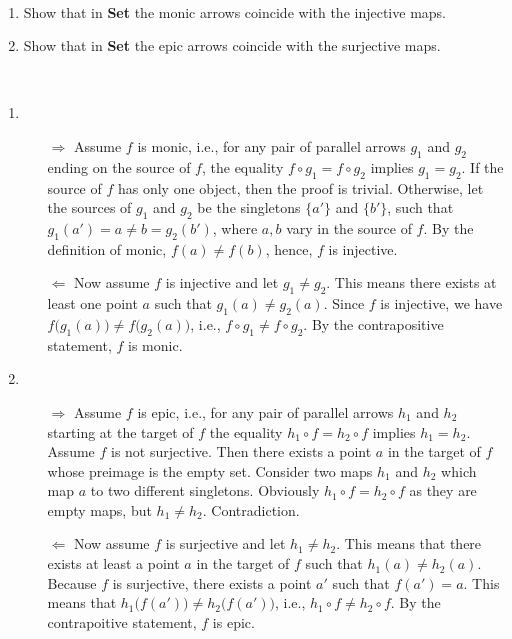 \documentclass[11pt,a4paper]{article}
\begin{document}
\begin{exercise}~
    \begin{enumerate}[label=(\alph*)]
        \item Show that in \textbf{Set} the monic arrows coincide with the injective maps.
        \item Show that in \textbf{Set} the epic arrows coincide with the surjective maps.
    \end{enumerate}
\end{exercise}
\begin{solution}~
    \begin{enumerate}[label=(\alph*)]
        \item \begin{enumerate}[label=(\alph*)]
            \item[$\Rightarrow$] Assume $f$ is monic, i.e., for any pair of parallel arrows $g_1$ and $g_2$ ending on the source of $f$, the equality $f\circ g_1=f\circ g_2$ implies $g_1=g_2$. If the source of $f$ has only one object, then the proof is trivial. Otherwise, let the sources of $g_1$ and $g_2$ be the singletons $\{a'\}$ and $\{b'\}$, such that $g_1(a')=a\neq b= g_2(b')$, where $a, b$ vary in the source of $f$. By the definition of monic, $f(a)\neq f(b)$, hence, $f$ is injective.
            \item[$\Leftarrow$] Now assume $f$ is injective and let $g_1\neq g_2$. This means there exists at least one point $a$ such that $g_1(a)\neq g_2(a)$. Since $f$ is injective, we have $f\big(g_1(a)\big)\neq f\big(g_2(a)\big)$, i.e., $f\circ g_1\neq f\circ g_2$. By the contrapositive statement, $f$ is monic.
        \end{enumerate}
        \item \begin{enumerate}[label=(\alph*)]
            \item[$\Rightarrow$] Assume $f$ is epic, i.e., for any pair of parallel arrows $h_1$ and $h_2$ starting at the target of $f$ the equality $h_1\circ f=h_2\circ f$ implies $h_1=h_2$. Assume $f$ is not surjective. Then there exists a point $a$ in the target of $f$ whose preimage is the empty set. Consider two maps $h_1$ and $h_2$ which map $a$ to two different singletons. Obviously $h_1\circ f=h_2\circ f$ as they are empty maps, but $h_1\neq h_2$. Contradiction.
            \item[$\Leftarrow$] Now assume $f$ is surjective and let $h_1\neq h_2$. This means that there exists at least a point $a$ in the target of $f$ such that $h_1(a)\neq h_2(a)$. Because $f$ is surjective, there exists a point $a'$ such that $f(a')=a$. This means that $h_1\big(f(a')\big) \neq  h_2\big(f(a')\big)$, i.e., $h_1\circ f\neq h_2\circ f$. By the contrapoitive statement, $f$ is epic.
        \end{enumerate}
    \end{enumerate}
\end{solution}
\end{document}
